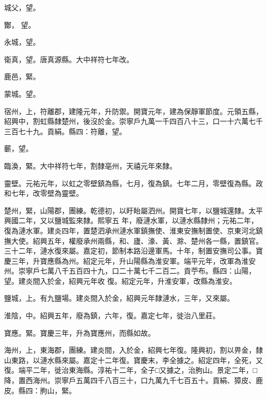 \begin{pinyinscope}
 城父，望。



 酇，
 望。



 永城，望。



 衛真，望。唐真源縣。大中祥符七年改。



 鹿邑，緊。



 蒙城。望。



 宿州，上，符離郡，建隆元年，升防禦。開寶元年，建為保靜軍節度。元領五縣，紹興中，割虹縣隸楚州，後沒於金。崇寧戶九萬一千四百八十三，口一十六萬七千三百七十九。貢絹。縣四：符離，望。



 蘄，望。



 臨渙，緊。大中祥符七年，割隸亳州，天禧元年來隸。



 靈壁。元祐元年，以虹之零壁鎮為縣，七月，復為鎮。七年二月，零壁復為縣。政和七年，改零壁為靈壁。



 楚州，緊，山陽郡，團練。乾德初，以盱眙屬泗州。開寶七年，以鹽城還隸。太平興國二年，又以鹽城監來隸。熙寧五
 年，廢漣水軍，以漣水縣隸州；元祐二年，復為漣水軍。建炎四年，置楚泗承州漣水軍鎮撫使、淮東安撫制置使、京東河北鎮撫大使。紹興五年，權廢承州兩縣，和、廬、濠、黃、滁、楚州各一縣，置鎮官。三十二年，漣水復來屬。嘉定初，節制本路沿邊軍馬。十年，制置安撫司公事。寶慶三年，升寶應縣為州。紹定元年，升山陽縣為淮安軍。端平元年，改軍為淮安州。崇寧戶七萬八千五百四十九，口二十萬七千二百二。貢苧布。縣四：山陽，望。建炎間入於金，紹興元年收
 復。紹定元年，升淮安軍，改縣為淮安。



 鹽城，上。有九鹽場。建炎間入於金，紹興元年隸漣水，三年，又來屬。



 淮陰，中。紹興五年，廢為鎮，六年，復。嘉定七年，徙治八里莊。



 寶應。緊。寶慶三年，升為寶應州，而縣如故。



 海州，上，東海郡，團練。建炎間，入於金，紹興七年復。隆興初，割以畀金，隸山東路，以漣水縣來屬。嘉定十二年復。寶慶末，李全據之。紹定四年，全死，又復。端平二年，徙治東海縣。淳祐十二年，全子□又據之，治朐山。景定二年，□降，置西海州。崇寧戶五萬四千八百三十，口九萬九千七百五十。貢絹、獐皮、鹿皮。縣四：朐山，緊。




\end{pinyinscope}

